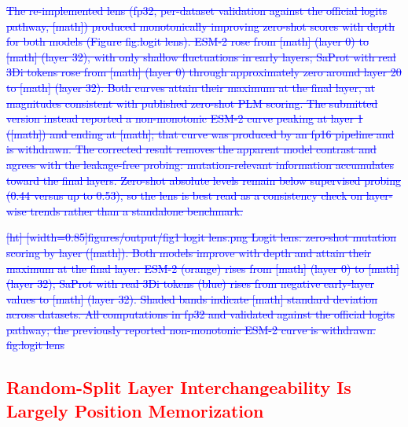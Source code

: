 \documentclass[11pt,a4paper]{article}
\newcommand{\rev}[1]{\textcolor{red}{#1}}
\begin{document}
\textcolor{blue}{\sout{The re-implemented lens (fp32, per-dataset validation against the official
logits pathway, [math]) produced monotonically improving zero-shot scores with
depth for both models (Figure fig:logit lens). ESM-2 rose from [math]
(layer 0) to [math] (layer 32), with only shallow fluctuations in early
layers; SaProt with real 3Di tokens rose from [math] (layer 0) through
approximately zero around layer 20 to [math] (layer 32). Both curves attain
their maximum at the final layer, at magnitudes consistent with published zero-shot
PLM scoring. The submitted version instead reported a non-monotonic ESM-2 curve
peaking at layer 1 ([math]) and ending at [math]; that curve was produced
by an fp16 pipeline and is withdrawn. The corrected result removes the apparent
model contrast and agrees with the leakage-free probing: mutation-relevant
information accumulates toward the final layers. Zero-shot absolute levels remain
below supervised probing (0.44 versus up to 0.53), so the lens is best read as a
consistency check on layer-wise trends rather than a standalone benchmark.}}

\textcolor{blue}{\sout{[ht]
[width=0.85]figures/output/fig1 logit lens.png
Logit lens: zero-shot mutation scoring by layer ([math]).
Both models improve with depth and attain their maximum at the final layer:
ESM-2 (orange) rises from [math] (layer 0) to [math] (layer 32);
SaProt with real 3Di tokens (blue) rises from negative early-layer values to
[math] (layer 32). Shaded bands indicate [math] standard deviation across
datasets. All computations in fp32 and validated against the official logits
pathway; the previously reported non-monotonic ESM-2 curve is withdrawn.
fig:logit lens}}

\textcolor{red}{\subsection{\rev{Random-Split Layer Interchangeability Is Largely Position Memorization}}}
\end{document}
